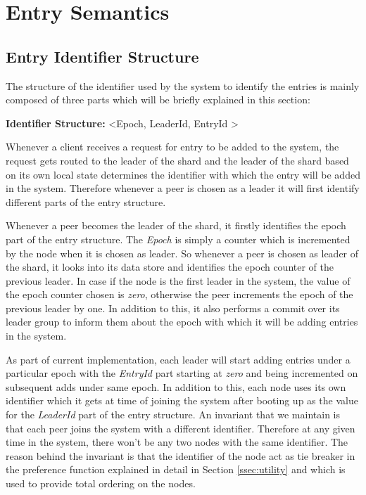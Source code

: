 \documentclass[12pt,a4paper,twoside,openright]{book}
\begin{document}
\section{Entry Semantics}

\subsection{Entry Identifier Structure}
\label{ssec:entryIdStructure}
The structure of the identifier used by the system to identify the entries is mainly composed of three parts which will be briefly explained in this section:

\begin{tcolorbox}
\textbf{Identifier Structure:} \textless Epoch, LeaderId, EntryId \textgreater
\end{tcolorbox}

Whenever a client receives a request for entry to be added to the system, the request gets routed to the leader of the shard and the leader of the shard based on its own local state determines the identifier with which the entry will be added in the system. Therefore whenever a peer is chosen as a leader it will first identify different parts of the entry structure. 
\par Whenever a peer becomes the leader of the shard, it firstly identifies the epoch part of the entry structure. The \textit{Epoch} is simply a counter which is incremented by the node when it is chosen as leader. So whenever a peer is chosen as leader of the shard, it looks into its data store and identifies the epoch counter of the previous leader. In case if the node is the first leader in the system, the value of the epoch counter chosen is \textit{zero}, otherwise the peer increments the epoch of the previous leader by one. In addition to this, it also performs a commit over its leader group to inform them about the epoch with which it will be adding entries in the system. 
\par As part of current implementation, each leader will start adding entries under a particular epoch with the \textit{EntryId} part starting at \textit{zero} and being incremented on subsequent adds under same epoch. In addition to this, each node uses its own identifier which it gets at time of joining the system after booting up as the value for the \textit{LeaderId} part of the entry structure.  An invariant that we maintain is that each peer joins the system with a different identifier. Therefore at any given time in the system, there won't be any two nodes with the same  identifier. The reason behind the invariant is that the identifier of the node act as tie breaker in the preference function explained in detail in Section \ref{ssec:utility} and which is used to provide total ordering on the nodes. 
\end{document}
